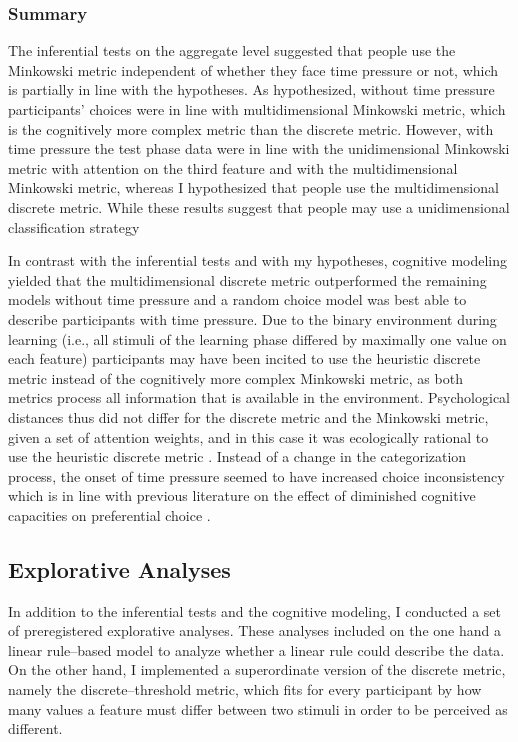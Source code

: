 \documentclass[a4paper,man,natbib]{apa6}
\begin{document}
\subsubsection{Summary}
The inferential tests on the aggregate level suggested that people use the Minkowski metric independent of whether they face time pressure or not, which is partially in line with the hypotheses. As hypothesized, without time pressure participants' choices were in line with multidimensional Minkowski metric, which is the cognitively more complex metric than the discrete metric. However, with time pressure the test phase data were in line with the unidimensional Minkowski metric with attention on the third feature and with the multidimensional Minkowski metric, whereas I hypothesized that people use the multidimensional discrete metric. While these results suggest that people may use a unidimensional classification strategy  

In contrast with the inferential tests and with my hypotheses, cognitive modeling yielded that the multidimensional discrete metric outperformed the remaining models without time pressure and a random choice model was best able to describe participants with time pressure. Due to the binary environment during learning (i.e., all stimuli of the learning phase differed by maximally one value on each feature) participants may have been incited to use the heuristic discrete metric instead of the cognitively more complex Minkowski metric, as both metrics process all information that is available in the environment. Psychological distances thus did not differ for the discrete metric and the Minkowski metric, given a set of attention weights, and in this case it was ecologically rational to use the heuristic discrete metric \citep{todd2007environments}. Instead of a change in the categorization process, the onset of time pressure seemed to have increased choice inconsistency which is in line with previous literature on the effect of diminished cognitive capacities on preferential choice \citep{olschewski2018taxing, burks2009cognitive}.

\subsection{Explorative Analyses}
In addition to the inferential tests and the cognitive modeling, I conducted a set of preregistered explorative analyses. These analyses included on the one hand a linear rule--based model to analyze whether a linear rule could describe the data. On the other hand, I implemented a superordinate version of the discrete metric, namely the discrete--threshold metric, which fits for every participant by how many values a feature must differ between two stimuli in order to be perceived as different.
\end{document}
